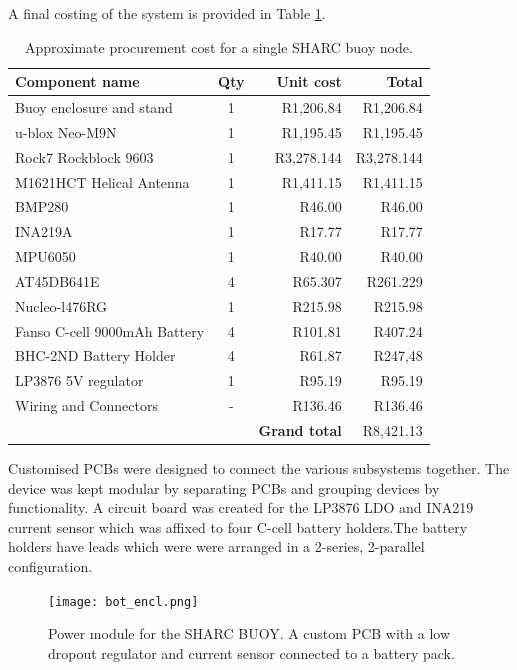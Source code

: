A final costing of the system is provided in Table \ref{tab:total_cost}.
\begin{table}[H]
	\centering
	\caption{Approximate procurement cost for a single SHARC buoy node.}
	\setlength{\extrarowheight}{5pt}
	\begin{tabular}{l c r r}
		\hline \hline
		\textbf{Component name} & \textbf{Qty} & \textbf{Unit cost} & \textbf{Total}  \\
		\hline \hline
		Buoy enclosure and stand  & 1 & R1,206.84 & R1,206.84 \\
		u-blox Neo-M9N & 1 &  R1,195.45 &R1,195.45\\
		Rock7 Rockblock 9603 & 1 & R3,278.144 & R3,278.144 \\
		M1621HCT Helical Antenna & 1 & R1,411.15 & R1,411.15 \\
		BMP280 & 1 & R46.00 & R46.00 \\
		INA219A & 1 & R17.77 & R17.77 \\
		MPU6050 & 1 & R40.00 & R40.00 \\
		AT45DB641E & 4 & R65.307 & R261.229 \\
		Nucleo-l476RG & 1 & R215.98 & R215.98 \\
		Fanso C-cell 9000mAh Battery & 4 & R101.81 & R407.24 \\
		BHC-2ND Battery Holder & 4 & R61.87 & R247,48 \\
		LP3876 5V regulator & 1 & R95.19 & R95.19 \\
		Wiring and Connectors & - & R136.46 & R136.46 \\
		\hline 
		\hline
		& & \textbf{ Grand total } & R8,421.13\\ 
		\hline \hline
	\end{tabular}
	\label{tab:total_cost}
\end{table}

Customised PCBs were designed to connect the various subsystems together. The device was kept modular by separating PCBs and grouping devices by functionality. A circuit board was created for the LP3876 LDO and INA219 current sensor which was affixed to four C-cell battery holders.The battery holders have leads which were were arranged in a 2-series, 2-parallel configuration.

\begin{figure}[H]
	\centering
	\texttt{[image: bot\_encl.png]}
	\caption{Power module for the SHARC BUOY. A custom PCB with a low dropout regulator and current sensor connected to a battery pack.}
	\label{fig:bot_elec}
\end{figure}


